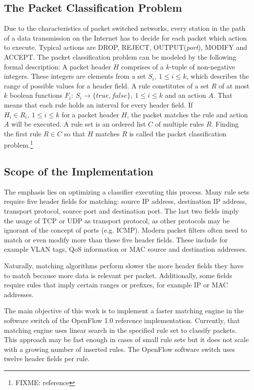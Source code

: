 \documentclass[conference]{IEEEtran}
\begin{document}
\subsection{The Packet Classification Problem}
Due to the characteristics of packet switched networks, every station in the path of a data transmission on the Internet 
has to decide for each packet which action to execute.
Typical actions are DROP, REJECT, OUTPUT(\textit{port}), MODIFY and ACCEPT.
The packet classification problem can be modeled by the following formal description:
A packet header $H$ comprises of a $k$-tuple of non-negative integers.
These integers are elements from a set $S_i,\ 1 \leq i \leq k$, which describes the range of possible values for a header field.
A rule constitutes of a set $R$ of at most $k$ boolean functions
$F_i:\ S_i \rightarrow \{true, false\},\ 1 \leq i \leq k$ and an action $A$.
That means that each rule holds an interval for every header field.
If $H_i \in R_i,\ 1 \leq i \leq k$ for a packet header $H$, the packet matches the rule and action $A$ will be executed.
A rule set is an ordered list $C$ of multiple rules $R$.
Finding the first rule $R \in C$ so that $H$ matches 
$R$ is called the packet classification problem.\footnote{FIXME: reference}

\subsection{Scope of the Implementation}
The emphasis lies on optimizing a classifier executing this process.
Many rule sets require five header fields for matching: source 
IP address, destination IP address, transport protocol, source port and destination port.
The last two fields imply the usage of TCP or UDP as transport protocol, 
as other protocols may be ignorant of the concept of ports (e.g. ICMP).
Modern packet filters often need to match or even modify more than these five header fields.
These include for example VLAN tags, QoS information or MAC source and destination addresses.

Naturally, matching algorithms perform slower the more header fields they 
have to match because more data is relevant per packet.
Additionally, some fields require rules that imply certain ranges or prefixes, for example IP or MAC addresses.

The main objective of this work is to implement a faster matching engine in the 
software switch of the OpenFlow 1.0 reference implementation.
Currently, that matching engine uses linear search in the specified rule set to classify packets.
This approach may be fast enough in cases of small rule sets but it does not scale
with a growing number of inserted rules.
The OpenFlow software switch uses twelve header fields per rule.
\end{document}
